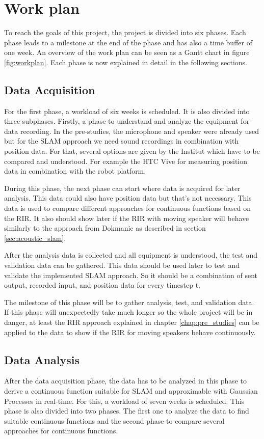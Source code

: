 \section{Work plan}

To reach the goals of this project, the project is divided into six phases. Each phase leads to a milestone at the end of the phase and has also a time buffer of one week. An overview of the work plan can be seen as a Gantt chart in figure \ref{fig:workplan}. Each phase is now explained in detail in the following sections.

\subsection{Data Acquisition}
For the first phase, a workload of six weeks is scheduled. It is also divided into three subphases. Firstly, a phase to understand and analyze the equipment for data recording. In the pre-studies, the microphone and speaker were already used but for the SLAM approach we need sound recordings in combination with position data. For that, several options are given by the Institut which have to be compared and understood. For example the HTC Vive for measuring position data in combination with the robot platform.

During this phase, the next phase can start where data is acquired for later analysis. This data could also have position data but that's not necessary. This data is used to compare different approaches for continuous functions based on the RIR. It also should show later if the RIR with moving speaker will behave similarly to the approach from Dokmanic \cite{dokmanic_roomrecslam_2016} as described in section \ref{sec:acoustic_slam}.

After the analysis data is collected and all equipment is understood, the test and validation data can be gathered. This data should be used later to test and validate the implemented SLAM approach. So it should be a combination of sent output, recorded input, and position data for every timestep t.

The milestone of this phase will be to gather analysis, test, and validation data. If this phase will unexpectedly take much longer so the whole project will be in danger, at least the RIR approach explained in chapter \ref{chap:pre_studies} can be applied to the data to show if the RIR for moving speakers behave continuously. 

\subsection{Data Analysis}
\label{phase:data_analysis}
After the data acquisition phase, the data has to be analyzed in this phase to derive a continuous function suitable for SLAM and approximable with Gaussian Processes in real-time. For this, a workload of seven weeks is scheduled. This phase is also divided into two phases. The first one to analyze the data to find suitable continuous functions and the second phase to compare several approaches for continuous functions.

